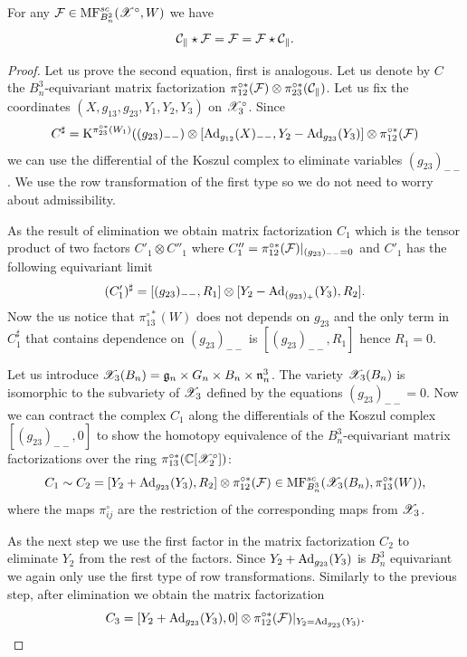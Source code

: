 \begin{proposition}\label{prop: unit} For any $\mathcal{F}\in \mathrm{MF}^{sc}_{B^2_n}(\mathscr{X}^{\circ},W)$ we have
$$ \mathcal{C}_{\parallel}\star \mathcal{F}=\mathcal{F}=\mathcal{F}\star\mathcal{C}_{\parallel}.$$
\end{proposition}
\begin{proof}
Let us prove the second equation, first is analogous.
Let us denote by $C$ the $B_n^3$-equivariant matrix factorization $\pi_{12}^{\circ*}(\mathcal{F})
\otimes \pi_{23}^{\circ *}(\mathcal{C}_{\parallel})$. Let us fix the  coordinates $(X,g_{13},g_{23}, Y_1,Y_2,Y_3)$ on $\mathscr{X}^{\circ}_3$. Since
$$C^\sharp=\mathrm{K}^{\pi_{23}^{\circ*}(W_1)}((g_{23})_{--})\otimes [{\rm Ad}_{g_{12}}(X)_{--},Y_2-{\rm Ad}_{g_{23}}(Y_3)]\otimes \pi_{12}^{\circ*}(\mathcal{F})$$
we can use the differential of the Koszul complex to eliminate variables $(g_{23})_{--}$. We use the row transformation of the first type so we do not need to worry about
admissibility.

 As the result of elimination we obtain matrix factorization $C_1$ which is the tensor product of two factors $C'_1\otimes C''_1$  where $C''_1=\pi_{12}^{\circ *}(\mathcal{F})|_{(g_{23})_{--}=0}$ and
 $C'_1$ has the following equivariant limit
 $$ (C'_1)^{\sharp}=[(g_{23})_{--},R_1]\otimes [Y_2-{\rm Ad}_{(g_{23})_+}(Y_3),R_2].$$
 Now the us notice that $\pi_{13}^{\circ *}(W)$ does not depends on $g_{23}$ and the only term in $C_1^\sharp$ that contains dependence on $(g_{23})_{--}$ is
 $[(g_{23})_{--},R_1]$ hence $R_1=0$.


 Let us introduce $\mathscr{X}_{3}(B_n)=\mathfrak{g}_n\times G_n\times B_n\times \mathfrak{n}_n^3$.
 The variety $\mathscr{X}_3(B_n)$ is isomorphic to the subvariety of $\mathscr{X}_3$ defined by the equations $(g_{23})_{--}=0$.
 Now we can contract the complex $C_1$ along the differentials of the Koszul complex $[(g_{23})_{--},0]$ to show the homotopy equivalence of
 the $B_n^3$-equivariant  matrix factorizations over the ring $\pi_{13}^{\circ*}(\mathbb{C}[\mathscr{X}_2^{\circ}])$:
 $$C_1\sim C_2= [Y_2+{\rm Ad}_{g_{23}}(Y_3),R_2]\otimes \pi_{12}^{\circ*}(\mathcal{F})\in \mathrm{MF}^{sc}_{B_n^3}(\mathscr{X}_3(B_n),\pi_{13}^{\circ*}(W)),$$
 where the maps $\pi_{ij}^{\circ}$ are the restriction of the corresponding maps from $\mathscr{X}_3$.

 As the next step we use the first factor in the matrix factorization $C_2$ to eliminate $Y_2$ from the rest of the factors. Since $Y_2+{\rm Ad}_{g_{23}}(Y_3)$ is $B_n^3$ equivariant we again only
 use the first type of row transformations. Similarly to the previous step, after elimination we obtain the matrix factorization
 $$ C_3=[Y_2+{\rm Ad}_{g_{23}}(Y_3),0]\otimes  \pi_{12}^{\circ*}(\mathcal{F})|_{Y_2={\rm Ad}_{g_{23}}(Y_3)}.$$


\end{proof}
